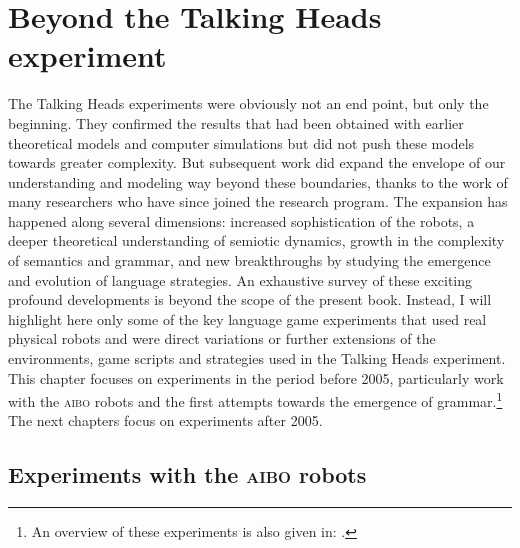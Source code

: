 \chapter{Beyond the Talking Heads experiment}
\label{c:postscriptum}
\setcounter{foot}{1}

The Talking Heads experiments were obviously not an end point, but only the beginning. They confirmed the results that 
had been obtained with earlier theoretical models and computer simulations but did not push these models 
towards greater complexity. But subsequent work did expand the envelope of our understanding and modeling way  
beyond these boundaries, thanks to the work of many researchers who have since joined the research program. 
The expansion has happened along several dimensions: increased sophistication of the robots, a deeper theoretical 
understanding of semiotic dynamics, growth in the complexity of semantics and grammar, and new breakthroughs by 
studying the emergence and evolution of language strategies. An exhaustive survey of these exciting profound developments 
is beyond the scope of the present book. Instead, I will highlight here only some of the key language game experiments that 
used real physical robots and were direct variations or further extensions of the environments, game scripts
and strategies used in the Talking Heads experiment. This chapter focuses on experiments 
in the period before 2005, particularly work with the \textsc{aibo} robots and the first attempts towards the emergence 
of grammar.\footnote{An overview of these experiments is also given in: \cite{Steels:2005}.}
The next chapters focus on experiments after 2005. 

\section{Experiments with the \textsc{aibo} robots} 

